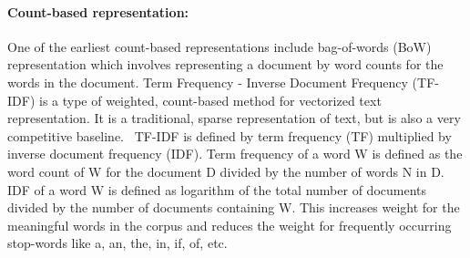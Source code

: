 \documentclass[]{spie}  %
\begin{document}
\paragraph{Count-based representation: }
One of the earliest count-based representations include bag-of-words (BoW) representation which involves representing a document by word counts for the words in the document.
Term Frequency - Inverse Document Frequency (TF-IDF) is a type of weighted, count-based method for vectorized text representation.
It is a traditional, sparse representation of text, but is also a very competitive baseline.~\cite{tfidfBow}
TF-IDF is defined by term frequency (TF) multiplied by inverse document frequency (IDF).
Term frequency of a word W is defined as the word count of W for the document D divided by the number of words N in D.
IDF of a word W is defined as logarithm of the total number of documents divided by the number of documents containing W.
This increases weight for the meaningful words in the corpus and reduces the weight for frequently occurring stop-words like a, an, the, in, if, of, etc.
\end{document}
